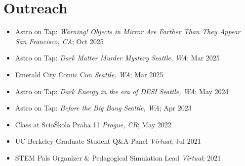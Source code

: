 \section{Outreach}
\begin{itemize}
    \item Astro on Tap: \textit{Warning! Objects in Mirror Are Farther Than They Appear} \hfill \textit{San Francisco, CA}; Oct 2025

    \item Astro on Tap: \textit{Dark Matter Murder Mystery} \hfill \textit{Seattle, WA}; Mar 2025

    \item Emerald City Comic Con \hfill \textit{Seattle, WA}; Mar 2025

    \item Astro on Tap: \textit{Dark Energy in the era of DESI} \hfill \textit{Seattle, WA}; May 2024

    \item Astro on Tap: \textit{Before the Big Bang} \hfill \textit{Seattle, WA}; Apr 2023

    \item Class at ScioŠkola Praha 11 \hfill \textit{Prague, CR}; May 2022

    \item UC Berkeley Graduate Student Q\&A Panel \hfill \textit{Virtual}; Jul 2021

    \item STEM Pals Organizer \& Pedagogical Simulation Lead \hfill \textit{Virtual}; 2021


\end{itemize}
